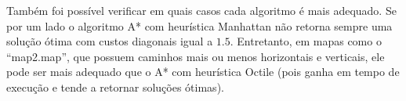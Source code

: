 \documentclass[12pt]{article}
\begin{document}
Também foi possível verificar em quais casos cada algoritmo é mais adequado. Se por um lado o algoritmo A* com heurística Manhattan não retorna sempre uma solução ótima com custos diagonais igual a $ 1.5 $. Entretanto, em mapas como o ``map2.map'', que possuem caminhos mais ou menos horizontais e verticais, ele pode ser mais adequado que o A* com heurística Octile (pois ganha em tempo de execução e tende a retornar soluções ótimas).



\end{document}
